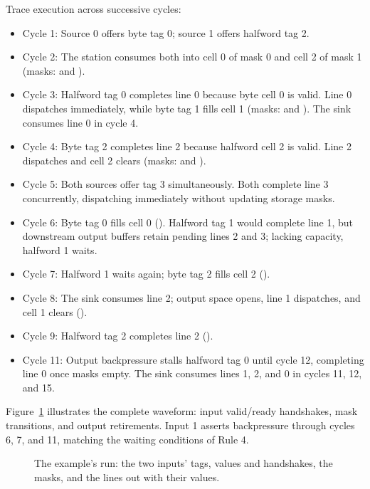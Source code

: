 \documentclass[journal,9pt]{IEEEtran}
\begin{document}


Trace execution across successive cycles:

\begin{itemize}
\item Cycle 1: Source 0 offers byte tag 0; source 1 offers halfword tag 2.
\item Cycle 2: The station consumes both into cell 0 of mask 0 and cell 2 of
  mask 1 (masks:  and ).
\item Cycle 3: Halfword tag 0 completes line 0 because byte cell 0 is valid.
  Line 0 dispatches immediately, while byte tag 1 fills cell 1 (masks:
   and ). The sink consumes line 0 in cycle 4.
\item Cycle 4: Byte tag 2 completes line 2 because halfword cell 2 is valid.
  Line 2 dispatches and cell 2 clears (masks:  and ).
\item Cycle 5: Both sources offer tag 3 simultaneously. Both complete line 3
  concurrently, dispatching immediately without updating storage masks.
\item Cycle 6: Byte tag 0 fills cell 0 (). Halfword tag 1 would
  complete line 1, but downstream output buffers retain pending lines 2 and 3;
  lacking capacity, halfword 1 waits.
\item Cycle 7: Halfword 1 waits again; byte tag 2 fills cell 2 ().
\item Cycle 8: The sink consumes line 2; output space opens, line 1 dispatches,
  and cell 1 clears ().
\item Cycle 9: Halfword tag 2 completes line 2 ().
\item Cycle 11: Output backpressure stalls halfword tag 0 until cycle 12,
  completing line 0 once masks empty. The sink consumes lines 1, 2, and 0 in
  cycles 11, 12, and 15.
\end{itemize}

Figure~\ref{fig:s-wave} illustrates the complete waveform: input valid/ready
handshakes, mask transitions, and output retirements. Input 1 asserts backpressure
through cycles 6, 7, and 11, matching the waiting conditions of Rule 4.

\begin{figure}[t]
\centering

\caption{The example's run: the two inputs' tags, values and
handshakes, the masks, and the lines out with their values.}
\label{fig:s-wave}
\end{figure}
\end{document}
